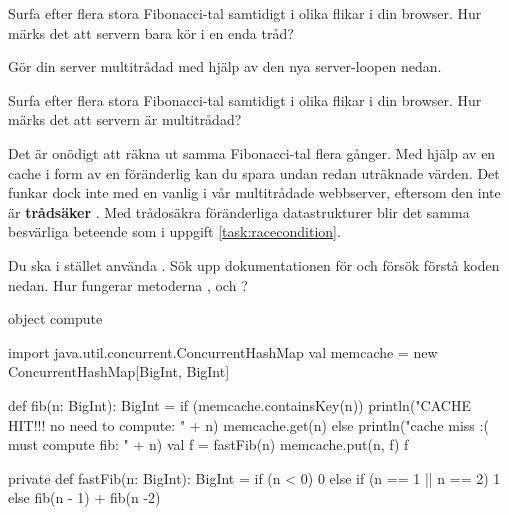 \Subtask Surfa efter flera stora Fibonacci-tal samtidigt i olika flikar i din browser. Hur märks det att servern bara kör i en enda tråd?

\Subtask Gör din server multitrådad med hjälp av den nya server-loopen nedan.


\Subtask Surfa efter flera stora Fibonacci-tal samtidigt i olika flikar i din browser. Hur märks det att servern är multitrådad?


\Subtask Det är onödigt att räkna ut samma Fibonacci-tal flera gånger. Med hjälp av en cache i form av en föränderlig  kan du spara undan redan uträknade värden. Det funkar dock inte med en vanlig  i vår multitrådade webbserver, eftersom den inte är \textbf{trådsäker} . Med trådosäkra föränderliga datastrukturer blir det samma besvärliga beteende som i uppgift \ref{task:racecondition}.

Du ska i stället använda . Sök upp  dokumentationen för  och försök förstå koden nedan. Hur fungerar metoderna ,  och ?
\begin{Code}
object compute {
  import java.util.concurrent.ConcurrentHashMap
  val memcache = new ConcurrentHashMap[BigInt, BigInt]

  def fib(n: BigInt): BigInt =
    if (memcache.containsKey(n)) {
      println("CACHE HIT!!! no need to compute: " + n)
      memcache.get(n)
    } else {
      println("cache miss :( must compute fib:  " + n)
      val f = fastFib(n)
      memcache.put(n, f)
      f
    }

  private def fastFib(n: BigInt): BigInt = {
    if (n < 0) 0 else
    if (n == 1 || n == 2) 1
    else fib(n - 1) + fib(n -2)
  }
}
\end{Code}

